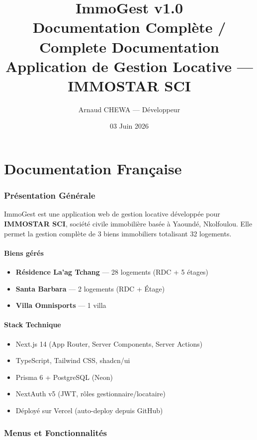 \documentclass[a4paper,11pt]{article}
\title{\textbf{ImmoGest v1.0} \\ \large Documentation Complète / Complete Documentation \\ Application de Gestion Locative — IMMOSTAR SCI}
\author{Arnaud CHEWA — Développeur}
\date{03 Juin 2026}
\begin{document}
\maketitle
\tableofcontents
\newpage

\part{Documentation Française}

\section{Présentation Générale}

ImmoGest est une application web de gestion locative développée pour \textbf{IMMOSTAR SCI}, société civile immobilière basée à Yaoundé, Nkolfoulou. Elle permet la gestion complète de 3 biens immobiliers totalisant 32 logements.

\subsection{Biens gérés}
\begin{itemize}
  \item \textbf{Résidence La'ag Tchang} — 28 logements (RDC + 5 étages)
  \item \textbf{Santa Barbara} — 2 logements (RDC + Étage)
  \item \textbf{Villa Omnisports} — 1 villa
\end{itemize}

\subsection{Stack Technique}
\begin{itemize}
  \item Next.js 14 (App Router, Server Components, Server Actions)
  \item TypeScript, Tailwind CSS, shadcn/ui
  \item Prisma 6 + PostgreSQL (Neon)
  \item NextAuth v5 (JWT, rôles gestionnaire/locataire)
  \item Déployé sur Vercel (auto-deploy depuis GitHub)
\end{itemize}

\section{Menus et Fonctionnalités}
\end{document}

